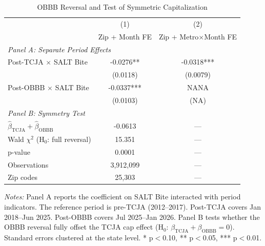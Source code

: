 \begin{table}[H]
\centering
\caption{OBBB Reversal and Test of Symmetric Capitalization}
\label{tab:symmetry}
\begin{threeparttable}
\begin{tabular}{lcc}
\toprule
 & (1) & (2) \\
 & Zip + Month FE & Zip + Metro$\times$Month FE \\
\midrule
\multicolumn{3}{l}{\textit{Panel A: Separate Period Effects}} \\[3pt]
Post-TCJA $\times$ SALT Bite & -0.0276** & -0.0318*** \\
 & (0.0118) & (0.0079) \\[3pt]
Post-OBBB $\times$ SALT Bite & -0.0337*** & NANA \\
 & (0.0103) & (NA) \\[6pt]
\multicolumn{3}{l}{\textit{Panel B: Symmetry Test}} \\[3pt]
$\hat{\beta}_{\text{TCJA}} + \hat{\beta}_{\text{OBBB}}$ & -0.0613 & --- \\
Wald $\chi^2$ (H$_0$: full reversal) & 15.351 & --- \\
p-value & 0.0001 & --- \\[3pt]
\midrule
Observations & 3,912,099 & --- \\
Zip codes & 25,303 & --- \\
\bottomrule
\end{tabular}
\begin{tablenotes}[flushleft]
\small
\item \textit{Notes:} Panel A reports the coefficient on SALT Bite interacted with period indicators. The reference period is pre-TCJA (2012--2017). Post-TCJA covers Jan 2018--Jun 2025. Post-OBBB covers Jul 2025--Jan 2026. Panel B tests whether the OBBB reversal fully offset the TCJA cap effect (H$_0$: $\beta_{\text{TCJA}} + \beta_{\text{OBBB}} = 0$). Standard errors clustered at the state level. * p$<$0.10, ** p$<$0.05, *** p$<$0.01.
\end{tablenotes}
\end{threeparttable}
\end{table}
